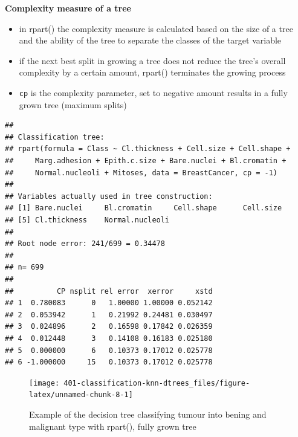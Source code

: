 \documentclass[
]{book}
\newenvironment{Shaded}{\begin{snugshade}}{\end{snugshade}}
\newcommand{\CommentTok}[1]{\textcolor[rgb]{0.56,0.35,0.01}{\textit{#1}}}
\newcommand{\FloatTok}[1]{\textcolor[rgb]{0.00,0.00,0.81}{#1}}
\newcommand{\NormalTok}[1]{#1}
\newcommand{\OperatorTok}[1]{\textcolor[rgb]{0.81,0.36,0.00}{\textbf{#1}}}
\providecommand{\tightlist}{%
  \setlength{\itemsep}{0pt}\setlength{\parskip}{0pt}}
\theoremstyle{definition}
\theoremstyle{definition}
\theoremstyle{definition}
\theoremstyle{remark}
\begin{document}
\begin{Shaded}
\end{Shaded}

\textbf{Complexity measure of a tree}

\begin{itemize}
\tightlist
\item
  in rpart() the complexity measure is calculated based on the size of a tree and the ability of the tree to separate the classes of the target variable
\item
  if the next best split in growing a tree does not reduce the tree's overall complexity by a certain amount, rpart() terminates the growing process
\item
  \texttt{cp} is the complexity parameter, set to negative amount results in a fully grown tree (maximum splits)
\end{itemize}

\begin{verbatim}
## 
## Classification tree:
## rpart(formula = Class ~ Cl.thickness + Cell.size + Cell.shape + 
##     Marg.adhesion + Epith.c.size + Bare.nuclei + Bl.cromatin + 
##     Normal.nucleoli + Mitoses, data = BreastCancer, cp = -1)
## 
## Variables actually used in tree construction:
## [1] Bare.nuclei     Bl.cromatin     Cell.shape      Cell.size      
## [5] Cl.thickness    Normal.nucleoli
## 
## Root node error: 241/699 = 0.34478
## 
## n= 699 
## 
##          CP nsplit rel error  xerror     xstd
## 1  0.780083      0   1.00000 1.00000 0.052142
## 2  0.053942      1   0.21992 0.24481 0.030497
## 3  0.024896      2   0.16598 0.17842 0.026359
## 4  0.012448      3   0.14108 0.16183 0.025180
## 5  0.000000      6   0.10373 0.17012 0.025778
## 6 -1.000000     15   0.10373 0.17012 0.025778
\end{verbatim}

\begin{figure}

{\centering \texttt{[image: 401-classification-knn-dtrees\_files/figure-latex/unnamed-chunk-8-1]} 

}

\caption{Example of the decision tree classifying tumour into bening and malignant type with rpart(), fully grown tree}\label{fig:unnamed-chunk-8}
\end{figure}
\end{document}
